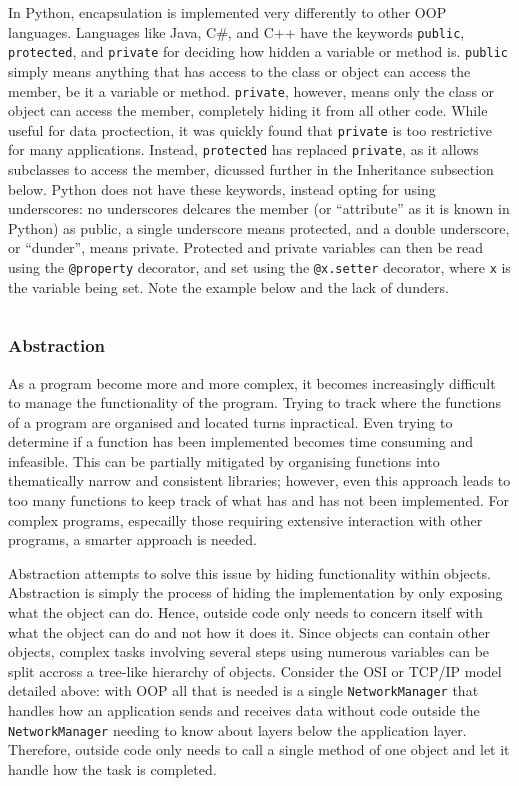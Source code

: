 \documentclass[11pt]{article}
\begin{document}
In Python, encapsulation is implemented very differently to other OOP languages. Languages like Java, C#, and C++ have the keywords \texttt{public}, \texttt{protected}, and \texttt{private} for deciding how hidden a variable or method is. \texttt{public} simply means anything that has access to the class or object can access the member, be it a variable or method. \texttt{private}, however, means only the class or object can access the member, completely hiding it from all other code. While useful for data proctection, it was quickly found that \texttt{private} is too restrictive for many applications. Instead, \texttt{protected} has replaced \texttt{private}, as it allows subclasses to access the member, dicussed further in the Inheritance subsection below. Python does not have these keywords, instead opting for using underscores: no underscores delcares the member (or ``attribute'' as it is known in Python) as public, a single underscore means protected, and a double underscore, or ``dunder'', means private. Protected and private variables can then be read using the \texttt{@property} decorator, and set using the \texttt{@x.setter} decorator, where \texttt{x} is the variable being set. Note the example below and the lack of dunders.

\inputminted[linenos=true]{python}{python_examples/encapsulation.py}

\subsubsection{Abstraction}

As a program become more and more complex, it becomes increasingly difficult to manage the functionality of the program. Trying to track where the functions of a program are organised and located turns inpractical. Even trying to determine if a function has been implemented becomes time consuming and infeasible. This can be partially mitigated by organising functions into thematically narrow and consistent libraries; however, even this approach leads to too many functions to keep track of what has and has not been implemented. For complex programs, especailly those requiring extensive interaction with other programs, a smarter approach is needed.

Abstraction attempts to solve this issue by hiding functionality within objects. Abstraction is simply the process of hiding the implementation by only exposing what the object can do. Hence, outside code only needs to concern itself with what the object can do and not how it does it. Since objects can contain other objects, complex tasks involving several steps using numerous variables can be split accross a tree-like hierarchy of objects. Consider the OSI or TCP/IP model detailed above: with OOP all that is needed is a single \texttt{NetworkManager} that handles how an application sends and receives data without code outside the \texttt{NetworkManager} needing to know about layers below the application layer. Therefore, outside code only needs to call a single method of one object and let it handle how the task is completed.
\end{document}
